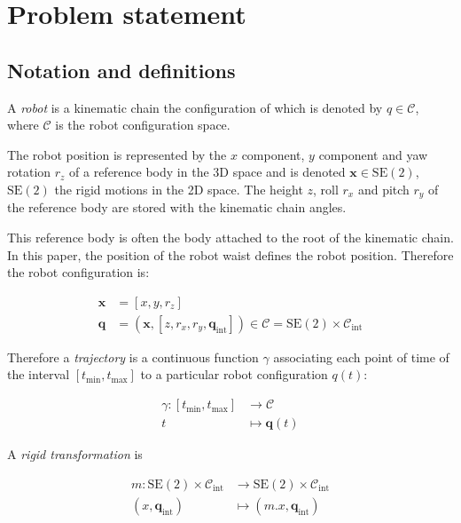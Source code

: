 \section{Problem statement} \label{problem}
\subsection{Notation and definitions}

A \emph{robot} is a kinematic chain the configuration of which is
denoted by \mbox{$q \in \mathcal{C}$}, where $\mathcal{C}$ is the
robot configuration space.

The robot position is represented by the $x$ component, $y$ component
and yaw rotation $r_z$ of a reference body in the 3D space and is
denoted \mbox{$\mathbf{x} \in \text{SE}(2)$, $\text{SE}(2)$} the rigid
motions in the 2D space.  The height $z$, roll $r_x$ and pitch $r_y$
of the reference body are stored with the kinematic chain angles.

This reference body is often the body attached to the root of the
kinematic chain. In this paper, the position of the robot waist
defines the robot position. Therefore the robot configuration is:

\begin{equation} \label{eq:cfg}
  \begin{aligned}
    \mathbf{x} &= [x, y, r_z]\\
    \mathbf{q} &= (\mathbf{x}, [z, r_x, r_y, \mathbf{q}_{\text{int}}])
    \in \mathcal{C} = \text{SE}(2) \times \mathcal{C}_{\text{int}}
  \end{aligned}
\end{equation}



Therefore a \emph{trajectory} is a continuous function $\gamma$ associating
each point of time of the interval \mbox{$[t_{\text{min}}, t_{\text{max}}]$}
to a particular robot configuration \mbox{$q(t)$}:

\begin{equation} \label{eq:traj}
  \begin{aligned}
    \gamma \colon [t_{\text{min}}, t_{\text{max}}] &\to \mathcal{C}\\
    t &\mapsto \mathbf{q}(t)
  \end{aligned}
\end{equation}


A \emph{rigid transformation} is

\begin{equation} \label{eq:rigidtrans}
  \begin{aligned}
    m \colon \text{SE}(2) \times \mathcal{C}_{\text{int}} &\to \text{SE}(2) \times \mathcal{C}_{\text{int}}\\
    (x, \mathbf{q}_{\text{int}}) &\mapsto (m . x, \mathbf{q}_{\text{int}})
  \end{aligned}
\end{equation}


